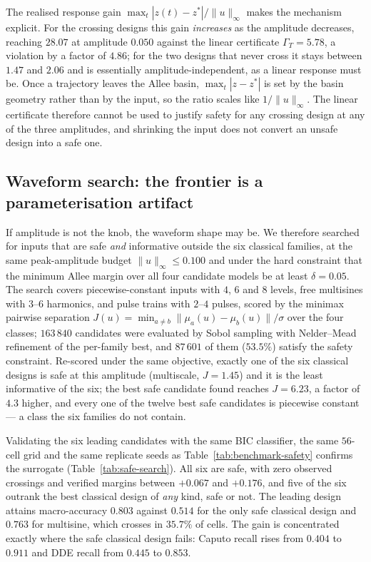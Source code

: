 The realised response gain $\max_t|z(t)-z^*|/\|u\|_\infty$ makes the mechanism explicit. For the crossing designs this gain \emph{increases} as the amplitude decreases, reaching $28.07$ at amplitude $0.050$ against the linear certificate $\Gamma_T=5.78$, a violation by a factor of $4.86$; for the two designs that never cross it stays between $1.47$ and $2.06$ and is essentially amplitude-independent, as a linear response must be. Once a trajectory leaves the Allee basin, $\max_t|z-z^*|$ is set by the basin geometry rather than by the input, so the ratio scales like $1/\|u\|_\infty$. The linear certificate therefore cannot be used to justify safety for any crossing design at any of the three amplitudes, and shrinking the input does not convert an unsafe design into a safe one.

\subsection{Waveform search: the frontier is a parameterisation artifact}
\label{subsec:safe-search}
If amplitude is not the knob, the waveform shape may be. We therefore searched for inputs that are safe \emph{and} informative outside the six classical families, at the same peak-amplitude budget $\|u\|_\infty\le0.100$ and under the hard constraint that the minimum Allee margin over all four candidate models be at least $\delta=0.05$. The search covers piecewise-constant inputs with $4$, $6$ and $8$ levels, free multisines with $3$--$6$ harmonics, and pulse trains with $2$--$4$ pulses, scored by the minimax pairwise separation $J(u)=\min_{a\neq b}\|\mu_a(u)-\mu_b(u)\|/\sigma$ over the four classes; $163\,840$ candidates were evaluated by Sobol sampling with Nelder--Mead refinement of the per-family best, and $87\,601$ of them ($53.5\%$) satisfy the safety constraint. Re-scored under the same objective, exactly one of the six classical designs is safe at this amplitude (multiscale, $J=1.45$) and it is the least informative of the six; the best safe candidate found reaches $J=6.23$, a factor of $4.3$ higher, and every one of the twelve best safe candidates is piecewise constant --- a class the six families do not contain.

Validating the six leading candidates with the same BIC classifier, the same $56$-cell grid and the same replicate seeds as Table~\ref{tab:benchmark-safety} confirms the surrogate (Table~\ref{tab:safe-search}). All six are safe, with zero observed crossings and verified margins between $+0.067$ and $+0.176$, and five of the six outrank the best classical design of \emph{any} kind, safe or not. The leading design attains macro-accuracy $0.803$ against $0.514$ for the only safe classical design and $0.763$ for multisine, which crosses in $35.7\%$ of cells. The gain is concentrated exactly where the safe classical design fails: Caputo recall rises from $0.404$ to $0.911$ and DDE recall from $0.445$ to $0.853$.

